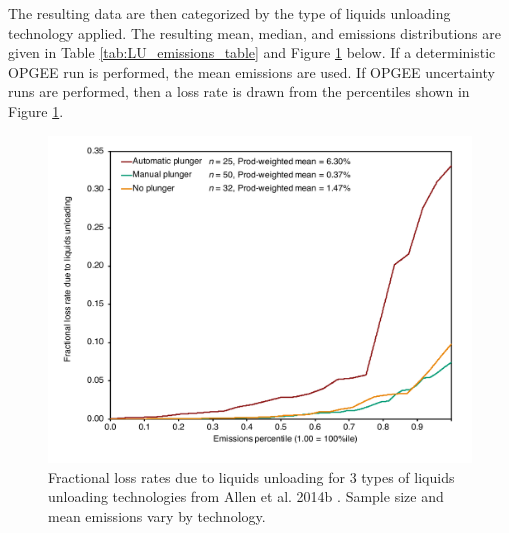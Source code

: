 \documentclass[11pt]{report}
\begin{document}
The resulting data are then categorized by the type of liquids unloading technology applied. The resulting mean, median, and emissions distributions are given in Table \ref{tab:LU_emissions_table} and Figure \ref{fig:Liquids_Unloading} below. If a deterministic OPGEE run is performed, the mean emissions are used. If OPGEE uncertainty runs are performed, then a loss rate is drawn from the percentiles shown in Figure \ref{fig:Liquids_Unloading}.

\begin{figure}[]
\includegraphics[width=0.8\columnwidth]{images/Liquids_Unloading.pdf}
\caption{Fractional loss rates due to liquids unloading for 3 types of liquids unloading technologies from Allen et al. 2014b \cite{Allen2014b}. Sample size and mean emissions vary by technology.}
\label{fig:Liquids_Unloading}
\end{figure}
\end{document}
